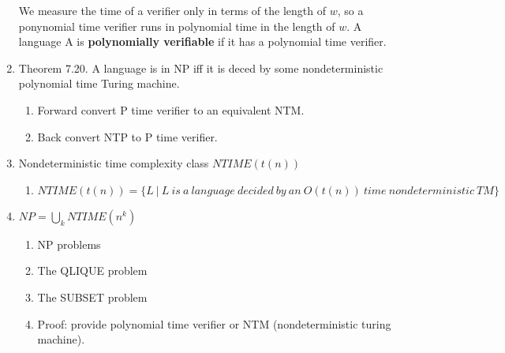 \documentclass{article}
\newcommand\curl[1]{\{#1\}}
\newcommand{\imp}[1]{\textbf{#1}}
\begin{document}
\begin{enumerate}[1., leftmargin = 0.6cm]
We measure the time of a verifier only in terms of the length of $w$, so a
ponynomial time verifier runs in polynomial time in the length of $w$. A language A
is \imp{polynomially verifiable} if it has a polynomial time verifier.
\item Theorem 7.20. A language is in NP iff it is deced by some nondeterministic
polynomial time Turing machine.
    \begin{enumerate}[1., leftmargin = 0.6cm]
    \itemsep0em
    \item Forward convert P time verifier to an equivalent NTM.
    \item Back    convert NTP to P time verifier.
    \end{enumerate}
\item Nondeterministic time complexity class $NTIME(t(n))$
    \begin{enumerate}[1., leftmargin = 0.6cm]
    \itemsep0em
    \item $NTIME(t(n)) = \curl{L\ |\ L\ is\ a\ language\ decided\ by\ an\ O(t(n))\
    time\ nondeterministic\ TM}$
    \end{enumerate}
\item $NP = \bigcup_k NTIME(n^k)$
    \begin{enumerate}[1., leftmargin = 0.6cm]
    \itemsep0em
    \item NP problems
    \item The QLIQUE problem
    \item The SUBSET problem

    \item Proof: provide polynomial time verifier or NTM (nondeterministic turing
    machine).


\end{enumerate}
\end{enumerate}
\end{document}
